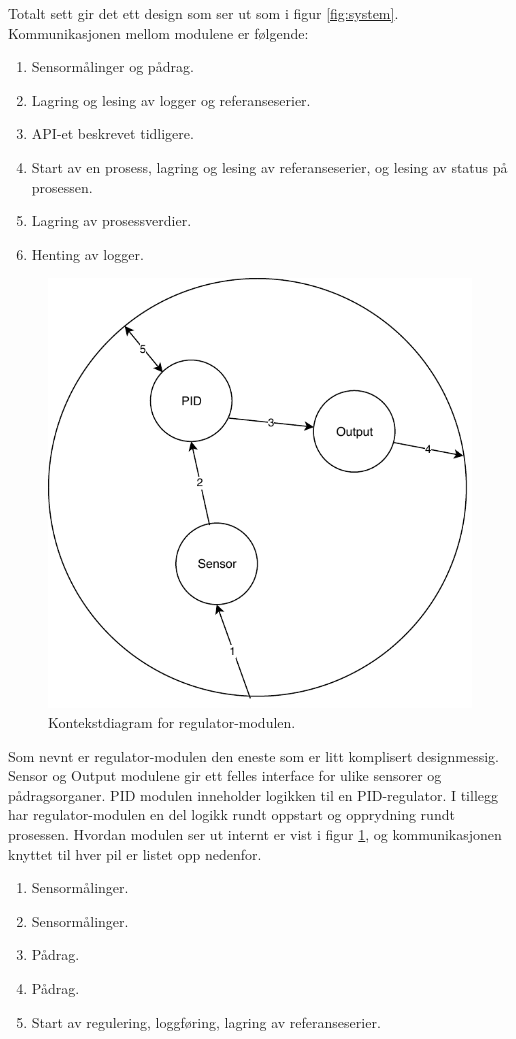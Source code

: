 Totalt sett gir det ett design som ser ut som i figur \ref{fig:system}. Kommunikasjonen mellom modulene er følgende:
\begin{enumerate}
    \item Sensormålinger og pådrag.
    \item Lagring og lesing av logger og referanseserier.
    \item API-et beskrevet tidligere.
    \item Start av en prosess, lagring og lesing av referanseserier, og lesing av status på prosessen.
    \item Lagring av prosessverdier.
    \item Henting av logger.
\end{enumerate}


\begin{figure}
    \includegraphics[width=\textwidth]{figures/controller.pdf}
    \caption{Kontekstdiagram for regulator-modulen.}
    \label{fig:regulator}
\end{figure}

Som nevnt er regulator-modulen den eneste som er litt komplisert designmessig. Sensor og Output modulene gir ett felles interface for ulike sensorer og pådragsorganer. PID modulen inneholder logikken til en PID-regulator. I tillegg har regulator-modulen en del logikk rundt oppstart og opprydning rundt prosessen. Hvordan modulen ser ut internt er vist i figur \ref{fig:regulator}, og kommunikasjonen knyttet til hver pil er listet opp nedenfor.
\begin{enumerate}
    \item Sensormålinger.
    \item Sensormålinger.
    \item Pådrag.
    \item Pådrag.
    \item Start av regulering, loggføring, lagring av referanseserier.
\end{enumerate}